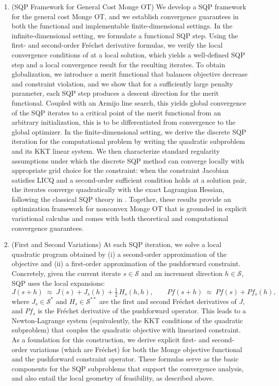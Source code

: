 \documentclass[12pt,leqno]{amsart}
\begin{document}
\begin{enumerate}[leftmargin=*, label=\arabic*.]
\item (SQP Framework for General Cost Monge OT)
We develop a SQP framework for the general cost Monge OT, and we establish convergence guarantees in both the functional and implementable finite-dimensional settings. 
In the infinite-dimensional setting, we formulate a functional SQP step. Using the first- and second-order Fr\'echet derivative formulas, we verify the local convergence conditions of \cite{alt1990lagrange} at a local solution, which yields a well-defined SQP step and a local convergence result for the resulting iterates. To obtain globalization, we introduce a merit functional that balances objective decrease and constraint violation, and we show that for a sufficiently large penalty parameter, each SQP step produces a descent direction for the merit functional. Coupled with an Armijo line search, this yields global convergence of the SQP iterates to a critical point of the merit functional from an arbitrary initialization, this is to be differentiated from convergence to the global optimizer.
In the finite-dimensional setting, we derive the discrete SQP iteration for the computational problem by writing the quadratic subproblem and its KKT linear system. We then characterize standard regularity assumptions under which the discrete SQP method can converge locally with appropriate grid choice for the constraint: when the constraint Jacobian satisfies LICQ and a second-order sufficient condition holds at a solution pair, the iterates converge quadratically with the exact Lagrangian Hessian, following the classical SQP theory in \cite{wright1999numerical}. Together, these results provide an optimization framework for nonconvex Monge OT that is grounded in explicit variational calculus and comes with both theoretical and computational convergence guarantees.

\item (First and Second Variations) 
At each SQP iteration, we solve a local quadratic program obtained by (i) a second-order approximation of the objective and (ii) a first-order approximation of the pushforward constraint. Concretely, given the current iterate $s\in\mathcal{S}$ and an
increment direction $h\in\mathcal{S}$, SQP uses the local expansions:
\[
J(s+h)\;\approx\; J(s) + J_s(h) + \tfrac12\,H_s(h,h),
\qquad
Pf(s+h)\;\approx\; Pf(s) + Pf_s(h),
\]
where $J_s\in\mathcal{S}^*$ and $H_s\in\mathcal{S}^{**}$ are the first and second Fr\'echet derivatives of $J$, and $Pf_s$ is the Fr\'echet derivative of the pushforward operator. This leads to a Newton-Lagrange system (equivalently, the KKT conditions of the quadratic subproblem) that couples the quadratic objective with linearized constraint. As a foundation for this construction, we derive explicit first- and second-order variations (which are Fr\'echet) for both the Monge objective functional and the pushforward constraint operator. These formulas serve as the basic components for the SQP subproblems that support the convergence analysis, and also entail the local geometry of feasibility, as described above.
\end{enumerate}
\end{document}
